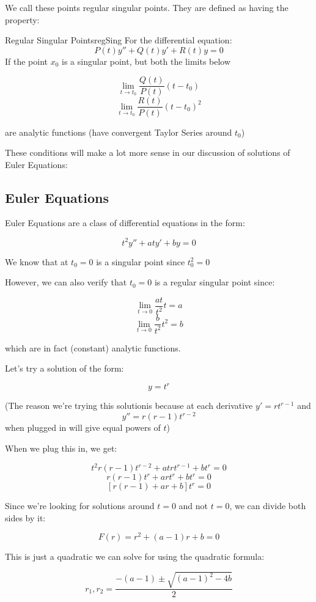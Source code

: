 \documentclass{report}
\begin{document}
We call these points regular singular points. They are defined as having the property:

\begin{mytheo}{Regular Singular Points}{regSing}
    For the differential equation:
     $$P(t)y'' + Q(t)y' + R(t)y = 0$$
     If the point $x_0$ is a singular point, but both the limits below
     
     $$\lim_{t \to t_0}\frac{Q(t)}{P(t)}(t-t_0)$$
     $$\lim_{t \to t_0}\frac{R(t)}{P(t)}(t-t_0)^2$$
     
     are analytic functions (have convergent Taylor Series around $t_0$)
\end{mytheo}


These conditions will make a lot more sense in our discussion of solutions of Euler Equations:

\subsection{Euler Equations}

Euler Equations are a class of differential equations in the form:

$$t^2y'' + aty' + by = 0$$

We know that at $t_0 = 0$ is a singular point since $t_0^2 = 0$

However, we can also verify that $t_0 = 0$ is a regular singular point since:


$$\lim_{t \to 0}\frac{at}{t^2}t = a$$
$$\lim_{t \to 0}\frac{b}{t^2}t^2 = b$$

which are in fact (constant) analytic functions.


Let's try a solution of the form:

$$y = t^r$$

(The reason we're trying this solutionis because at each derivative $y' = rt^{r-1}$ and $$y'' = r(r-1)t^{r-2}$$ when plugged in will give equal powers of $t$)

When we plug this in, we get:

$$t^2r(r-1)t^{r-2} + at rt^{r-1} + bt^r = 0$$
$$r(r-1)t^r + art^r + bt^r = 0$$
$$[r(r-1) + ar + b]t^r = 0$$

Since we're looking for solutions around $t=0$ and not $t=0$, we can divide both sides by it:

$$F(r) = r^2 + (a-1)r + b = 0$$

This is just a quadratic we can solve for using the quadratic formula:

$$r_1, r_2 = \frac{-(a-1) \pm \sqrt{(a-1)^2-4b}}{2}$$
\end{document}
